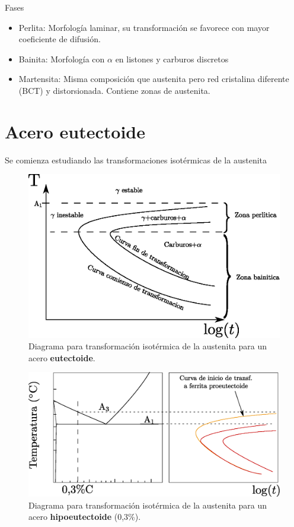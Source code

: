 \documentclass{article}
\begin{document}
Fases
\begin{itemize}
    \item Perlita: Morfología laminar, su transformación se favorece con mayor coeficiente de difusión.
    \item Bainita: Morfología con $\alpha$ en listones y carburos discretos
    \item Martensita: Misma composición que austenita pero red cristalina diferente (BCT) y distorsionada. Contiene zonas de austenita.
\end{itemize}



\section{Acero eutectoide}
Se comienza estudiando las transformaciones isotérmicas de la austenita
\begin{figure}[htb!]
    \centering
    \includegraphics[width=\textwidth]{fig/TTTbasic.eps}
    \caption{Diagrama para transformación isotérmica de la austenita para un acero \textbf{eutectoide}.}
    \label{fig:diagTTTbasico}
\end{figure}

\begin{figure}[htb!]
    \centering
    \includegraphics[width=\textwidth]{fig/diagTTThipo.eps}
    \caption{Diagrama para transformación isotérmica de la austenita para un acero \textbf{hipoeutectoide} (0,3\%).}
    \label{fig:diagTTThipo}
\end{figure}
\end{document}
